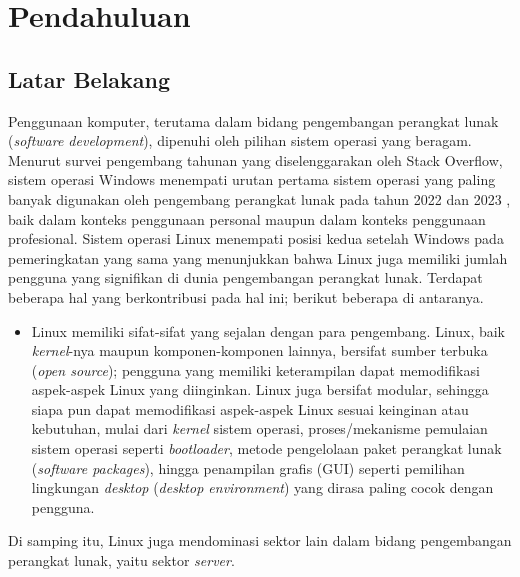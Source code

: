 \chapter{Pendahuluan}

\section{Latar Belakang}

Penggunaan komputer, terutama dalam bidang pengembangan perangkat lunak (\textit{software development}), dipenuhi oleh pilihan sistem operasi yang beragam. Menurut survei pengembang tahunan yang diselenggarakan oleh Stack Overflow, sistem operasi Windows menempati urutan pertama sistem operasi yang paling banyak digunakan oleh pengembang perangkat lunak pada tahun 2022 \cite{stackoverflow-developer-survey-2022-most-popular-os} dan 2023 \cite{stackoverflow-developer-survey-2023-most-popular-os}, baik dalam konteks penggunaan personal maupun dalam konteks penggunaan profesional. Sistem operasi Linux menempati posisi kedua setelah Windows pada pemeringkatan yang sama yang menunjukkan bahwa Linux juga memiliki jumlah pengguna yang signifikan di dunia pengembangan perangkat lunak. Terdapat beberapa hal yang berkontribusi pada hal ini; berikut beberapa di antaranya.
\begin{itemize}[leftmargin=1.5cm] %
    \item Linux memiliki sifat-sifat yang sejalan dengan para pengembang. Linux, baik \textit{kernel}-nya maupun komponen-komponen lainnya, bersifat sumber terbuka (\textit{open source}); pengguna yang memiliki keterampilan dapat memodifikasi aspek-aspek Linux yang diinginkan. Linux juga bersifat modular, sehingga siapa pun dapat memodifikasi aspek-aspek Linux sesuai keinginan atau kebutuhan, mulai dari \textit{kernel} sistem operasi, proses/mekanisme pemulaian sistem operasi seperti \textit{bootloader}, metode pengelolaan paket perangkat lunak (\textit{software packages}), hingga penampilan grafis (GUI) seperti pemilihan lingkungan \textit{desktop} (\textit{desktop environment}) yang dirasa paling cocok dengan pengguna.
\end{itemize}

Di samping itu, Linux juga mendominasi sektor lain dalam bidang pengembangan perangkat lunak, yaitu sektor \textit{server}.

